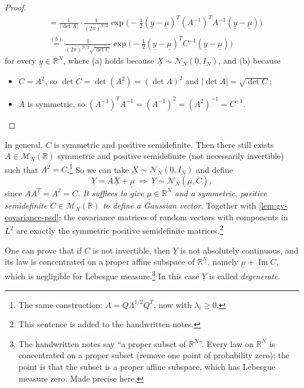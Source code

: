 \begin{proof}
\[\begin{aligned}
  &=\frac1{|\det A|}\cdot\frac1{(2\pi)^{N/2}}\exp\Big(-\frac12(\underline y-\underline\mu)^T(A^{-1})^TA^{-1}(\underline y-\underline\mu)\Big)\\
  &\overset{(b)}{=}\frac1{(2\pi)^{N/2}\sqrt{\det C}}\exp\Big(-\frac12(\underline y-\underline\mu)^TC^{-1}(\underline y-\underline\mu)\Big)
\end{aligned}
\]
for every $\underline y\in\mathbb R^N$, where (a) holds because
$\underline X\sim\mathcal N_N(\underline 0,I_N)$, and (b) because
\begin{itemize}
  \item $C=A^2$, so $\det C=\det(A^2)=(\det A)^2$ and $|\det A|=\sqrt{\det C}$;
  \item $A$ is symmetric, so $(A^{-1})^TA^{-1}=(A^{-1})^2=(A^2)^{-1}=C^{-1}$.\qedhere
\end{itemize}
\end{proof}

\begin{remark}\label{rem:gv-existence}
In general, $C$ is symmetric and positive semidefinite. Then there still exists
$A\in\mathcal M_N(\mathbb R)$ symmetric and positive semidefinite (not necessarily invertible) such
that $A^2=C$.\footnote{The same construction: $A=Q\Lambda^{1/2}Q^T$, now with $\lambda_i\ge0$.} So
we can take $\underline X\sim\mathcal N_N(\underline 0,I_N)$ and define
\[
  \underline Y=A\underline X+\underline\mu\ \Longrightarrow\ \underline Y\sim\mathcal N_N(\underline\mu,C),
\]
since $AA^T=A^2=C$. \emph{It suffices to give $\underline\mu\in\mathbb R^N$ and a symmetric,
positive semidefinite $C\in\mathcal M_N(\mathbb R)$ to define a Gaussian vector.} Together with
\cref{lem:gv-covariance-psd}: the covariance matrices of random vectors with components in $L^2$
are exactly the symmetric positive semidefinite matrices.\footnote{This sentence is added to the
handwritten notes.}
\end{remark}

\begin{remark}\label{rem:gv-degenerate}
One can prove that if $C$ is not invertible, then $\underline Y$ is not absolutely continuous, and
its law is concentrated on a proper affine subspace of $\mathbb R^N$, namely
$\underline\mu+\operatorname{Im}C$, which is negligible for Lebesgue measure.\footnote{The
handwritten notes say ``a proper subset of $\mathbb R^N$''. Every law on $\mathbb R^N$ is
concentrated on a proper subset (remove one point of probability zero); the point is that the
subset is a proper affine subspace, which has Lebesgue measure zero. Made precise here.} In this
case $\underline Y$ is called \emph{degenerate}.
\end{remark}

